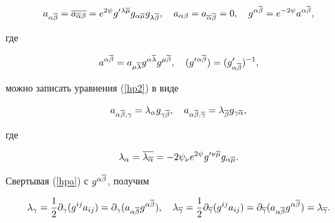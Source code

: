 \begin{equation}


\label{sin}


a_{\alpha\ol\beta}= \ol{a_{\ol \alpha\beta}} =


e^{2\psi}g'{}^{\lambda\ol\mu}g_{\alpha\ol\mu}


g_{\lambda\ol\beta}, \quad


a_{\alpha\beta}=a_{\ol\alpha\ol\beta}=0, \quad


g^{\alpha\ol\beta}= e^{-2\psi }


a^{\alpha\ol\beta},


\end{equation}


где


$$


a^{\alpha\ol\beta} = a_{\mu\ol\lambda}g^{\alpha\ol\lambda}


g^{\mu\ol\beta}, \quad (g'{}^{\alpha\ol\beta})= (g'_{\alpha\ol\beta})^{-1},


$$


можно записать уравнения (\ref{hp2}) в виде


\begin{equation}


\label{hpa}


a_{\alpha\ol\beta,\gamma} = \lambda_\alpha g_{\gamma\ol\beta}, \quad


a_{\alpha\ol\beta,\ol\gamma} = \lambda_{\ol\beta} g_{\gamma\ol\alpha},


\end{equation}


где


$$


\lambda_\alpha = \ol{\lambda_{\ol\alpha}} =


- 2 \psi_\nu e^{2 \psi}g'{}^{\nu\ol\mu} g_{\alpha\ol\mu}.


$$


Свертывая (\ref{hpa}) с $g^{\alpha\overline\beta}$, получим


\begin{equation}


\label{lambda}


\lambda_\gamma = \frac{1}{2} \pl\gamma (g^{ij} a_{ij}) =


\partial_{\gamma} (a_{\alpha\ol\beta} g^{\alpha\ol\beta}),


\quad


\lambda_{\ol\gamma} = \frac{1}{2}\pl{\ol\gamma} (g^{ij} a_{ij}) =


\partial_{\ol\gamma} (a_{\alpha\ol\beta} g^{\alpha\ol\beta}) =


\lambda_{\ol\gamma}.


\end{equation}


